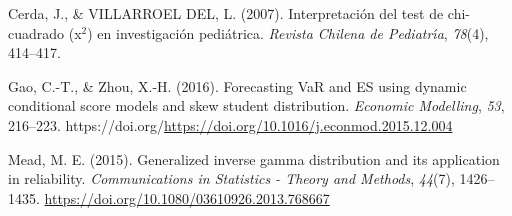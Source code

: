 \documentclass[
]{article}
\newlength{\cslhangindent}
\newlength{\cslentryspacingunit} %
\newenvironment{CSLReferences}[2] %
 {%
  \setlength{\parindent}{0pt}
  \ifodd #1
  \let\oldpar\par
  \def\par{\hangindent=\cslhangindent\oldpar}
  \fi
  \setlength{\parskip}{#2\cslentryspacingunit}
 }%
 {}
\begin{document}
\hypertarget{refs}{}
\begin{CSLReferences}{1}{0}
\leavevmode{}%
Cerda, J., \& VILLARROEL DEL, L. (2007). Interpretaci{ó}n del test de
chi-cuadrado (x\(^2\)) en investigaci{ó}n pedi{á}trica. \emph{Revista
Chilena de Pediatr{ı́}a}, \emph{78}(4), 414--417.

\leavevmode{}%
Gao, C.-T., \& Zhou, X.-H. (2016). Forecasting VaR and ES using dynamic
conditional score models and skew student distribution. \emph{Economic
Modelling}, \emph{53}, 216--223.
https://doi.org/\url{https://doi.org/10.1016/j.econmod.2015.12.004}

\leavevmode{}%
Mead, M. E. (2015). Generalized inverse gamma distribution and its
application in reliability. \emph{Communications in Statistics - Theory
and Methods}, \emph{44}(7), 1426--1435.
\url{https://doi.org/10.1080/03610926.2013.768667}

\end{CSLReferences}
\end{document}
